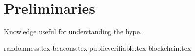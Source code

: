 \section{Preliminaries}\label{sec:preliminaries}
Knowledge useful for understanding the hype.

{randomness.tex}
{beacons.tex}
{publicverifiable.tex}
{blockchain.tex}

